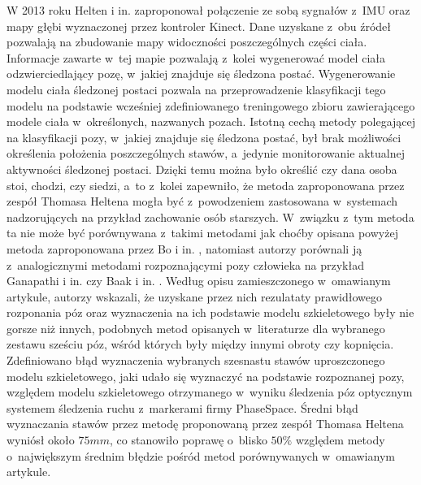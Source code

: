 W 2013 roku Helten i in. \cite{Helten2013} zaproponował połączenie ze sobą sygnałów z~IMU oraz mapy głębi wyznaczonej przez kontroler Kinect. Dane uzyskane z~obu źródeł pozwalają na zbudowanie mapy widoczności poszczególnych części ciała. Informacje zawarte w~tej mapie pozwalają z~kolei wygenerować model ciała odzwierciedlający pozę, w~jakiej znajduje się śledzona postać. Wygenerowanie modelu ciała śledzonej postaci pozwala na przeprowadzenie klasyfikacji tego modelu na podstawie wcześniej zdefiniowanego treningowego zbioru zawierającego modele ciała w~określonych, nazwanych pozach. Istotną cechą metody polegającej na klasyfikacji pozy, w~jakiej znajduje się śledzona postać, był brak możliwości określenia położenia poszczególnych stawów, a~jedynie monitorowanie aktualnej aktywności śledzonej postaci. Dzięki temu można było określić czy dana osoba stoi, chodzi, czy siedzi, a~to z~kolei zapewniło, że metoda zaproponowana przez zespół Thomasa Heltena mogła być z~powodzeniem zastosowana w~systemach nadzorujących na przykład zachowanie osób starszych. W~związku z~tym metoda ta nie może być porównywana z~takimi metodami jak choćby opisana powyżej metoda zaproponowana przez Bo i in. \cite{Bo2011a}, natomiast autorzy porównali ją z~analogicznymi metodami rozpoznającymi pozy człowieka na przykład Ganapathi i in. \cite{Ganapathi2010} czy Baak i in. \cite{Baak2011}. Według opisu zamieszczonego w~omawianym artykule, autorzy wskazali, że uzyskane przez nich rezulataty prawidłowego rozponania póz oraz wyznaczenia na ich podstawie modelu szkieletowego były nie gorsze niż innych, podobnych metod opisanych w~literaturze dla wybranego zestawu sześciu póz, wśród których były między innymi obroty czy kopnięcia. Zdefiniowano błąd wyznaczenia wybranych szesnastu stawów uproszczonego modelu szkieletowego, jaki udało się wyznaczyć na podstawie rozpoznanej pozy, względem modelu szkieletowego otrzymanego w~wyniku śledzenia póz optycznym systemem śledzenia ruchu z~markerami firmy PhaseSpace. Średni błąd wyznaczania stawów przez metodę proponowaną przez zespół Thomasa Heltena wyniósł około $75mm$, co stanowiło poprawę o~blisko $50\%$ względem metody o~największym średnim błędzie pośród metod porównywanych w~omawianym artykule.


